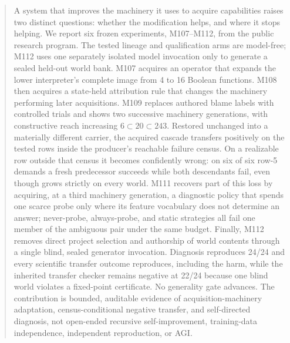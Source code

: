 \maketitle

\begin{abstract}
A system that improves the machinery it uses to acquire capabilities raises two distinct questions: whether the modification helps, and where it stops helping. We report six frozen experiments, M107--M112, from the public \genesis research program. The tested lineage and qualification arms are model-free; M112 uses one separately isolated model invocation only to generate a sealed held-out world bank. M107 acquires an operator that expands the lower interpreter's complete image from 4 to 16 Boolean functions. M108 then acquires a state-held attribution rule that changes the machinery performing later acquisitions. M109 replaces authored blame labels with controlled trials and shows two successive machinery generations, with constructive reach increasing $6\subset20\subset243$. Restored unchanged into a materially different carrier, the acquired cascade transfers positively on the tested rows inside the producer's reachable failure census. On a realizable row outside that census it becomes confidently wrong: on six of six row-5 demands a fresh predecessor succeeds while both descendants fail, even though \reach grows strictly on every world. M111 recovers part of this loss by acquiring, at a third machinery generation, a diagnostic policy that spends one scarce probe only where its feature vocabulary does not determine an answer; never-probe, always-probe, and static strategies all fail one member of the ambiguous pair under the same budget. Finally, M112 removes direct project selection and authorship of world contents through a single blind, sealed generator invocation. Diagnosis reproduces 24/24 and every scientific transfer outcome reproduces, including the harm, while the inherited transfer checker remains negative at 22/24 because one blind world violates a fixed-point certificate. No generality gate advances. The contribution is bounded, auditable evidence of acquisition-machinery adaptation, census-conditional negative transfer, and self-directed diagnosis, not open-ended recursive self-improvement, training-data independence, independent reproduction, or AGI.
\end{abstract}

